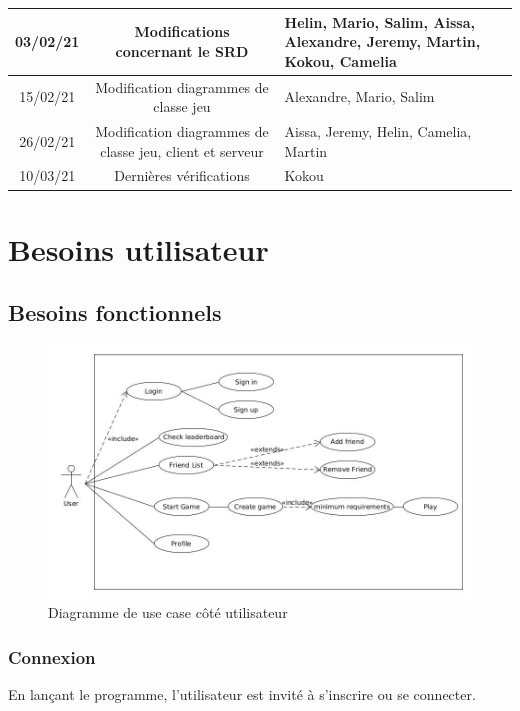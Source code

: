 \documentclass[a4paper,12pt]{article}
\begin{document}
\begin{tabularx}{15cm}{|c|c|X|}
	\hline
	    03/02/21 & Modifications concernant le SRD & Helin, Mario, Salim, Aissa,
		Alexandre, Jeremy, Martin, Kokou, Camelia\\
	\hline
	    15/02/21 & Modification diagrammes de classe jeu & Alexandre, Mario, Salim\\
	\hline
    	26/02/21 & Modification diagrammes de classe
	    jeu, client et serveur & Aissa, Jeremy, Helin, Camelia, Martin\\
	\hline
	    10/03/21 & Dernières vérifications & Kokou\\
	\hline

\end{tabularx}

\newpage

\section{Besoins utilisateur}

\subsection{Besoins fonctionnels}


\begin{figure}[h!]
\centering
\includegraphics[width=15cm]{images/UserUseCase.jpg}
\caption{Diagramme de use case côté utilisateur}
\label{fig:UserUseCase}
\end{figure}

\subsubsection{Connexion}
En lançant le programme, l'utilisateur est invité à s'inscrire ou se connecter.
\end{document}
